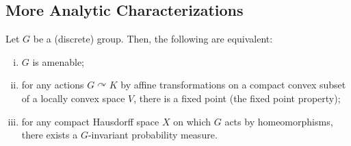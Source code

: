 \documentclass[10pt]{mypackage}
\begin{document}
\subsection{More Analytic Characterizations}%
\begin{theorem}
  Let $G$ be a (discrete) group. Then, the following are equivalent:
  \begin{enumerate}[(i)]
    \item $G$ is amenable;
    \item for any actions $G\curvearrowright K$ by affine transformations on a compact convex subset of a locally convex space $V$, there is a fixed point (the fixed point property);
    \item for any compact Hausdorff space $X$ on which $G$ acts by homeomorphisms, there exists a $G$-invariant probability measure.
  \end{enumerate}
\end{theorem}
\end{document}
